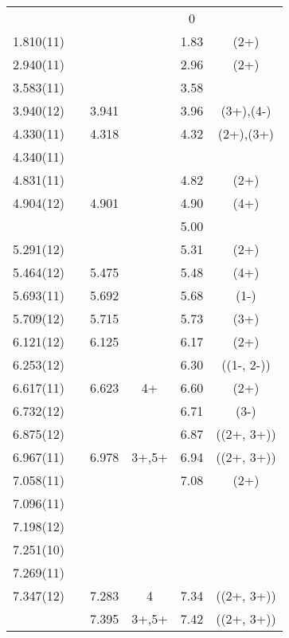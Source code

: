 \begin{center}
\begin{longtable}{cc cc cc}
                 &                 &               &                                                & 0     &   \\
1.810(11)        &                 &               &                                                & 1.83  & (2+)  \\
2.940(11)        &                 &               &                                                & 2.96  & (2+)  \\
3.583(11)        &                 &               &                                                & 3.58  &   \\
3.940(12)        &                 & 3.941 &   & 3.96  & (3+),(4-) \\
4.330(11)        &                 & 4.318 &   & 4.32  & (2+),(3+) \\
4.340(11)        &                 &   &   &   &   \\
4.831(11)        &                 &   &   & 4.82  & (2+)  \\
4.904(12)        &                 & 4.901 &   & 4.90  & (4+)  \\
  &   &   &   & 5.00  &   \\
5.291(12)   &   &   &   & 5.31  & (2+)  \\
5.464(12)   &   & 5.475 &   & 5.48  & (4+)  \\
5.693(11)   &   & 5.692 &   & 5.68  & (1-)  \\
5.709(12)   &   & 5.715 &   & 5.73  & (3+)  \\
6.121(12)   &   & 6.125 &   & 6.17  & (2+)  \\
6.253(12)   &   &   &   & 6.30  & ((1-, 2-))  \\
6.617(11)   &   & 6.623 & 4+  & 6.60  & (2+)  \\
6.732(12)   &   &   &   & 6.71  & (3-)  \\
6.875(12)   &   &   &   & 6.87  & ((2+, 3+))  \\
6.967(11)   &   & 6.978 & 3+,5+ & 6.94  & ((2+, 3+))  \\
7.058(11)   &   &   &   & 7.08  & (2+)  \\
7.096(11)   &   &   &   &   &   \\
7.198(12)   &   &   &   &   &   \\
7.251(10)   &   &   &   &   &   \\
7.269(11)   &   &   &   &   &   \\
7.347(12)   &   & 7.283 & 4 & 7.34  & ((2+, 3+))  \\
  &   & 7.395 & 3+,5+ & 7.42  & ((2+, 3+))  \\

\end{longtable}
\end{center}
